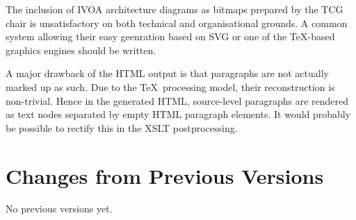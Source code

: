 \documentclass[11pt,a4paper]{ivoa}
\begin{document}
The inclusion of IVOA architecture diagrams as bitmaps prepared by the
TCG chair is unsatisfactory on both technical and organisational
grounds.  A common system allowing their easy geenration based on SVG or
one of the \TeX-based graphics engines should be written.

A major drawback of the HTML output is that paragraphs are not actually
marked up as such.  Due to the \TeX\ processing model, their
reconstruction is non-trivial.  Hence in the generated HTML,
source-level paragraphs are rendered as text nodes separated by empty
HTML paragraph elements.  It would probably be possible to rectify this
in the XSLT postprocessing.

\appendix
\section{Changes from Previous Versions}

No previous versions yet.  



\end{document}
